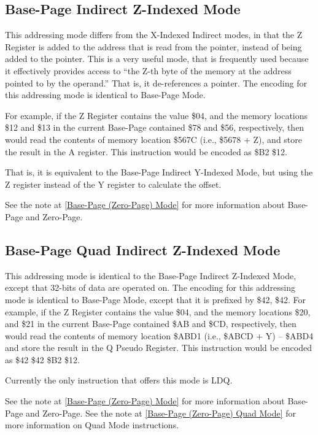 \subsection{Base-Page Indirect Z-Indexed Mode}

This addressing mode differs from the X-Indexed Indirect modes, in that the Z Register is
added to the address that is read from the pointer, instead of being added to the pointer.
This is a very useful mode, that is frequently used because it effectively provides access to
``the Z-th byte of the memory at the address pointed to by the operand.'' That is, it de-references
a pointer.
The encoding for this addressing mode is identical to Base-Page Mode.

For example, if the Z Register contains the value \$04, and the memory locations \$12 and \$13 in the current
Base-Page contained \$78 and \$56, respectively,
then  would read the contents of memory location \$567C (i.e., \$5678 + Z),
and store the result in the A register. This instruction would be encoded as \$B2 \$12.

That is, it is equivalent to the Base-Page Indirect Y-Indexed Mode, but using the Z register instead
of the Y register to calculate the offset.

See the note at \ref{Base-Page (Zero-Page) Mode} for more information about Base-Page and Zero-Page.

\subsection{Base-Page Quad Indirect Z-Indexed Mode}

This addressing mode is identical to the Base-Page Indirect Z-Indexed Mode, except that
32-bits of data are operated on. The encoding for this addressing mode is identical to
Base-Page Mode, except that it is prefixed by \$42, \$42.
For example, if the Z Register contains the value \$04, and the memory locations \$20, and \$21 in the current
Base-Page contained \$AB and \$CD, respectively,
then  would read the contents of memory location \$ABD1 (i.e., \$ABCD + Y) -- \$ABD4
and store the result in the Q Pseudo Register. This instruction would be encoded as \$42 \$42 \$B2 \$12.

Currently the only instruction that offers this mode is LDQ. 

See the note at \ref{Base-Page (Zero-Page) Mode} for more information about Base-Page and Zero-Page.
See the note at \ref{Base-Page (Zero-Page) Quad Mode} for more information on Quad Mode instructions.

